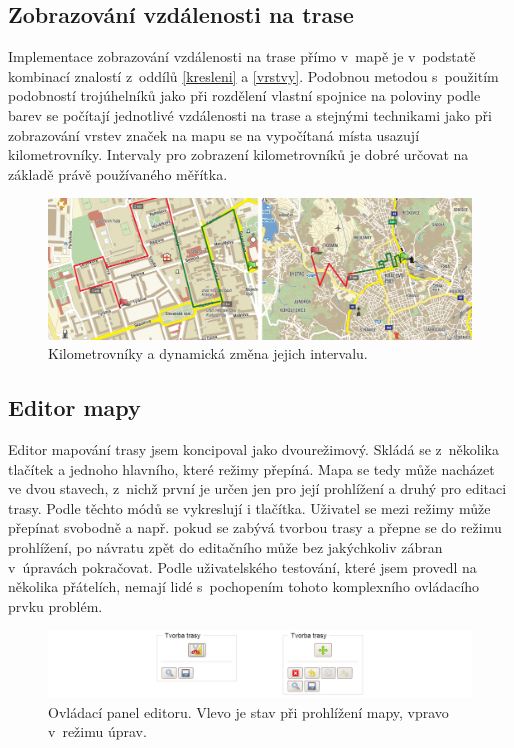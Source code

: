 \subsection{Zobrazování vzdálenosti na trase}
Implementace zobrazování vzdálenosti na trase přímo
v~mapě je v~podstatě kombinací znalostí z~oddílů \ref{kresleni} a
\ref{vrstvy}. Podobnou metodou s~použitím podobností trojúhelníků jako
při rozdělení vlastní spojnice na poloviny podle barev se počítají
jednotlivé vzdálenosti na trase a stejnými technikami jako při
zobrazování vrstev značek na mapu se na vypočítaná místa usazují
kilometrovníky. Intervaly pro zobrazení kilometrovníků je dobré určovat
na základě právě používaného měřítka.

\begin{figure}[h]
	\includegraphics[width=\textwidth, keepaspectratio]{fig/screenmilestones}
	\caption{Kilometrovníky a dynamická změna jejich intervalu.}
	\label{obrMilestones}
\end{figure}

\subsection{Editor mapy}
Editor mapování trasy jsem koncipoval jako dvourežimový. Skládá se
z~několika tlačítek a jednoho hlavního, které režimy přepíná. Mapa se
tedy může nacházet ve dvou stavech, z~nichž první je určen jen pro
její prohlížení a druhý pro editaci trasy. Podle těchto módů se
vykreslují i tlačítka. Uživatel se mezi režimy může přepínat svobodně
a např. pokud se zabývá tvorbou trasy a přepne se do režimu
prohlížení, po návratu zpět do editačního může bez jakýchkoliv zábran
v~úpravách pokračovat. Podle uživatelského testování, které jsem
provedl na několika přátelích, nemají lidé s~pochopením tohoto
komplexního ovládacího prvku problém.

\begin{figure}[h]
	\includegraphics[width=\textwidth, keepaspectratio]{fig/screeneditor}
	\caption{Ovládací panel editoru. Vlevo je stav při prohlížení mapy,
	vpravo v~režimu úprav.}
	\label{obrMilestones}
\end{figure}

